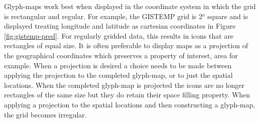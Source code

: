 \documentclass[oneside]{article}
\begin{document}
Glyph-maps work best when displayed in the coordinate system in which the grid is rectangular and regular.  For example, the GISTEMP grid is 2$^o$ square and is displayed treating longitude and latitude as cartesian coordinates in Figure \ref{fig:gistemp-pred}.  For regularly gridded data, this results in icons that are rectangles of equal size.  It is often preferable to display maps as a projection of the geographical coordinates which preserves a property of interest, area for example. When a projection is desired a choice needs to be made between applying the projection to the completed glyph-map, or to just the spatial locations.  When the completed glyph-map is projected the icons are no longer rectangles of the same size but they do retain their space filling property.  When applying a projection to the spatial locations and then constructing a glyph-map, the grid becomes irregular. 
\end{document}

